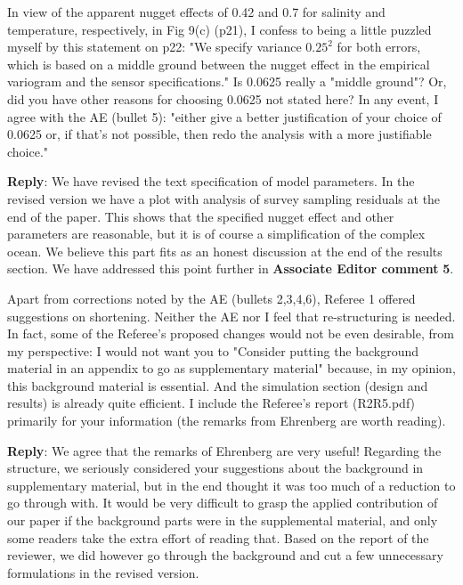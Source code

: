 \documentclass[a4paper]{article}
\newcounter{reviewer}
\def\aecom{\textbf{Associate Editor comment }}
\def\reply{\textbf{Reply}}
\begin{document}
\vspace{5mm}
 In view of the apparent nugget effects of 0.42 and 0.7 for salinity
and temperature, respectively, in Fig 9(c) (p21), I confess to being
a little puzzled myself by this statement on p22:
"We specify variance $0.25^2$ for both errors, which is based on a
middle ground between the nugget effect in the empirical variogram
and the sensor specifications."  Is 0.0625 really a "middle ground"?
Or, did you have other reasons for choosing 0.0625 not stated here?
In any event, I agree with the AE (bullet 5): "either give a better
justification of your choice of 0.0625 or, if that’s not possible,
then redo the analysis with a more justifiable choice."

\vspace{5mm}
\reply: We have revised the text specification of model parameters. In the revised version we have a plot with analysis of survey sampling residuals at the end of the paper. This shows that the specified nugget effect and other parameters are reasonable, but it is of course a simplification of the complex ocean. We believe this part fits as an honest discussion at the end of the results section. We have addressed this point further in \aecom \textbf{5}. 

\vspace{5mm}
 Apart from corrections noted by the AE (bullets 2,3,4,6), Referee 1
offered suggestions on shortening. Neither the AE nor I feel that re-structuring is needed.  In fact, some of the Referee's proposed changes would not be even desirable, from my perspective: I would not want you to "Consider putting the background material in an appendix to go as supplementary material" because, in my opinion, this background material is essential. And the simulation section (design and results) is already quite efficient. I include the Referee's report (R2R5.pdf) primarily for your information (the remarks from Ehrenberg are worth reading).

\vspace{5mm}
\reply: We agree that the remarks of Ehrenberg are very useful! Regarding the structure, we seriously considered your suggestions about the background in supplementary material, but in the end thought it was too much of a reduction to go through with. It would be very difficult to grasp the applied contribution of our paper if the background parts were in the supplemental material, and only some readers take the extra effort of reading that. Based on the report of the reviewer, we did however go through the background and cut a few unnecessary formulations in the revised version.
\end{document}
